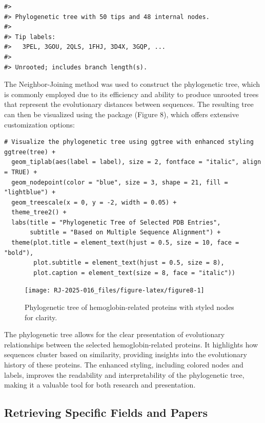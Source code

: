 \begin{verbatim}
#> 
#> Phylogenetic tree with 50 tips and 48 internal nodes.
#> 
#> Tip labels:
#>   3PEL, 3GOU, 2QLS, 1FHJ, 3D4X, 3GQP, ...
#> 
#> Unrooted; includes branch length(s).
\end{verbatim}

The Neighbor-Joining method \citep{saitou1987neighbor} was used to construct the phylogenetic tree, which is commonly employed due to its efficiency and ability to produce unrooted trees that represent the evolutionary distances between sequences. The resulting tree can then be visualized using the  package (Figure 8), which offers extensive customization options:

\begin{verbatim}
# Visualize the phylogenetic tree using ggtree with enhanced styling
ggtree(tree) +
  geom_tiplab(aes(label = label), size = 2, fontface = "italic", align = TRUE) +
  geom_nodepoint(color = "blue", size = 3, shape = 21, fill = "lightblue") +
  geom_treescale(x = 0, y = -2, width = 0.05) +
  theme_tree2() +
  labs(title = "Phylogenetic Tree of Selected PDB Entries",
       subtitle = "Based on Multiple Sequence Alignment") +
  theme(plot.title = element_text(hjust = 0.5, size = 10, face = "bold"),
        plot.subtitle = element_text(hjust = 0.5, size = 8),
        plot.caption = element_text(size = 8, face = "italic"))
\end{verbatim}

\begin{figure}[H]
\texttt{[image: RJ-2025-016\_files/figure-latex/figure8-1]} \caption{Phylogenetic tree of hemoglobin-related proteins with styled nodes for clarity.}\label{fig:figure8}
\end{figure}

The phylogenetic tree allows for the clear presentation of evolutionary relationships between the selected hemoglobin-related proteins. It highlights how sequences cluster based on similarity, providing insights into the evolutionary history of these proteins. The enhanced styling, including colored nodes and labels, improves the readability and interpretability of the phylogenetic tree, making it a valuable tool for both research and presentation.

\subsection{Retrieving Specific Fields and Papers}\label{retrieving-specific-fields-and-papers}

